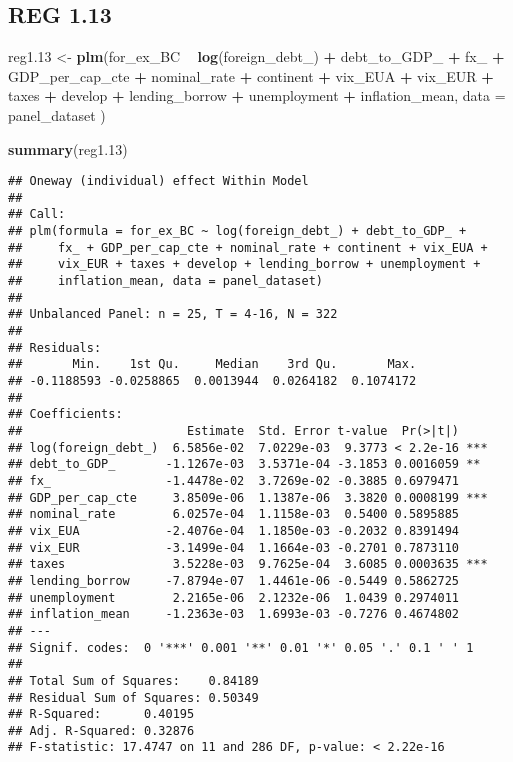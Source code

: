 \documentclass[]{article}
\newenvironment{Shaded}{\begin{snugshade}}{\end{snugshade}}
\newcommand{\KeywordTok}[1]{\textcolor[rgb]{0.13,0.29,0.53}{\textbf{#1}}}
\newcommand{\DataTypeTok}[1]{\textcolor[rgb]{0.13,0.29,0.53}{#1}}
\newcommand{\DecValTok}[1]{\textcolor[rgb]{0.00,0.00,0.81}{#1}}
\newcommand{\StringTok}[1]{\textcolor[rgb]{0.31,0.60,0.02}{#1}}
\newcommand{\OperatorTok}[1]{\textcolor[rgb]{0.81,0.36,0.00}{\textbf{#1}}}
\newcommand{\NormalTok}[1]{#1}
\begin{document}
\subsection{REG 1.13}\label{reg-1.13}

\begin{Shaded}
\begin{Highlighting}[]
\NormalTok{reg1.}\DecValTok{13}\NormalTok{ <-}\StringTok{ }\KeywordTok{plm}\NormalTok{(for_ex_BC }\OperatorTok{~}\StringTok{  }\KeywordTok{log}\NormalTok{(foreign_debt_) }\OperatorTok{+}\StringTok{ }\NormalTok{debt_to_GDP_ }\OperatorTok{+}\StringTok{ }\NormalTok{fx_ }\OperatorTok{+}\StringTok{ }\NormalTok{GDP_per_cap_cte }\OperatorTok{+}\StringTok{ }\NormalTok{nominal_rate }\OperatorTok{+}\StringTok{ }\NormalTok{continent }\OperatorTok{+}\StringTok{ }\NormalTok{vix_EUA }\OperatorTok{+}\StringTok{ }\NormalTok{vix_EUR }\OperatorTok{+}\StringTok{ }\NormalTok{taxes }\OperatorTok{+}\StringTok{ }\NormalTok{develop }\OperatorTok{+}\StringTok{ }\NormalTok{lending_borrow }\OperatorTok{+}\StringTok{ }\NormalTok{unemployment }\OperatorTok{+}\StringTok{ }\NormalTok{inflation_mean, }\DataTypeTok{data =}\NormalTok{ panel_dataset )}

\KeywordTok{summary}\NormalTok{(reg1.}\DecValTok{13}\NormalTok{)}
\end{Highlighting}
\end{Shaded}

\begin{verbatim}
## Oneway (individual) effect Within Model
## 
## Call:
## plm(formula = for_ex_BC ~ log(foreign_debt_) + debt_to_GDP_ + 
##     fx_ + GDP_per_cap_cte + nominal_rate + continent + vix_EUA + 
##     vix_EUR + taxes + develop + lending_borrow + unemployment + 
##     inflation_mean, data = panel_dataset)
## 
## Unbalanced Panel: n = 25, T = 4-16, N = 322
## 
## Residuals:
##       Min.    1st Qu.     Median    3rd Qu.       Max. 
## -0.1188593 -0.0258865  0.0013944  0.0264182  0.1074172 
## 
## Coefficients:
##                       Estimate  Std. Error t-value  Pr(>|t|)    
## log(foreign_debt_)  6.5856e-02  7.0229e-03  9.3773 < 2.2e-16 ***
## debt_to_GDP_       -1.1267e-03  3.5371e-04 -3.1853 0.0016059 ** 
## fx_                -1.4478e-02  3.7269e-02 -0.3885 0.6979471    
## GDP_per_cap_cte     3.8509e-06  1.1387e-06  3.3820 0.0008199 ***
## nominal_rate        6.0257e-04  1.1158e-03  0.5400 0.5895885    
## vix_EUA            -2.4076e-04  1.1850e-03 -0.2032 0.8391494    
## vix_EUR            -3.1499e-04  1.1664e-03 -0.2701 0.7873110    
## taxes               3.5228e-03  9.7625e-04  3.6085 0.0003635 ***
## lending_borrow     -7.8794e-07  1.4461e-06 -0.5449 0.5862725    
## unemployment        2.2165e-06  2.1232e-06  1.0439 0.2974011    
## inflation_mean     -1.2363e-03  1.6993e-03 -0.7276 0.4674802    
## ---
## Signif. codes:  0 '***' 0.001 '**' 0.01 '*' 0.05 '.' 0.1 ' ' 1
## 
## Total Sum of Squares:    0.84189
## Residual Sum of Squares: 0.50349
## R-Squared:      0.40195
## Adj. R-Squared: 0.32876
## F-statistic: 17.4747 on 11 and 286 DF, p-value: < 2.22e-16
\end{verbatim}
\end{document}
